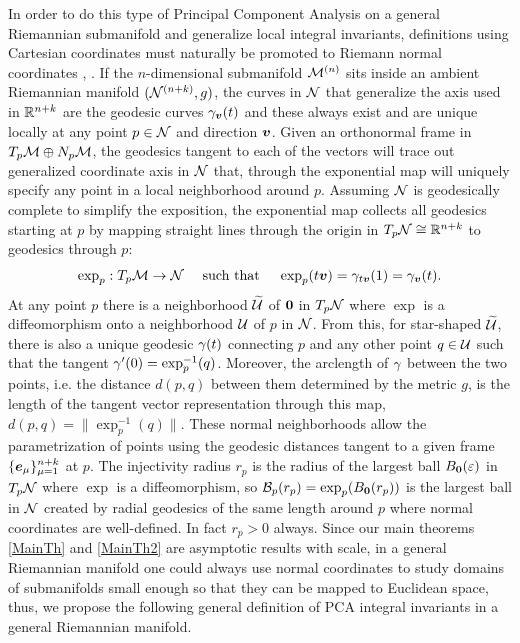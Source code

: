 \documentclass[letterpaper, reqno, 11pt]{amsart}
\theoremstyle{definition}
\theoremstyle{remark}
\numberwithin{equation}{section}
\begin{document}
In order to do this type of Principal Component Analysis on a general Riemannian submanifold and generalize local integral invariants, definitions using Cartesian coordinates must naturally be promoted to Riemann normal coordinates \cite{chavel2006}, \cite{oneil1983}.
If the $n$-dimensional submanifold ${\mathcal M}^{(n)}$ sits inside an ambient Riemannian manifold $(\mathcal{N}^{(n+k)},g)$, the curves in $\mathcal{N}$ that generalize the axis used in ${\mathbb R}^{n+k}$ are the geodesic curves $\gamma_{\boldsymbol{v}}(t)$ and these always exist and are unique locally at any point $p\in\mathcal{N}$ and direction $\boldsymbol{v}$. Given an orthonormal frame in $T_p{\mathcal M}\oplus N_p{\mathcal M}$, the geodesics tangent to each of the vectors will trace out generalized coordinate axis in $\mathcal{N}$ that, through the exponential map will uniquely specify any point in a local neighborhood around $p$. Assuming $\mathcal{N}$ is geodesically complete to simplify the exposition, the exponential map collects all geodesics starting at $p$ by mapping straight lines through the origin in $T_p\mathcal{N}\cong{\mathbb R}^{n+k}$ to geodesics through $p$:
$$
\exp_p: T_p\mathcal{M}\rightarrow\mathcal{N}\quad \text{ such that }\quad \exp_p(t\boldsymbol{v}) = \gamma_{t\boldsymbol{v}}(1)=\gamma_{\boldsymbol{v}}(t).
$$
At any point $p$ there is a neighborhood $\widetilde{\mathcal{U}}$ of $\boldsymbol{0}$ in $T_p\mathcal{N}$ where $\exp$ is a diffeomorphism onto a neighborhood $\mathcal{U}$ of $p$ in $\mathcal{N}$. From this, for star-shaped $\widetilde{\mathcal{U}}$, there is also a unique geodesic $\gamma(t)$ connecting $p$ and any other point $q\in\mathcal{U}$ such that the tangent $\gamma'(0)=\exp^{-1}_p(q)$. Moreover, the arclength of $\gamma$ between the two points, i.e. the distance $d(p,q)$ between them determined by the metric $g$, is the length of the tangent vector representation through this map, $d(p,q)  = \| \exp^{-1}_p(q) \|$.
These normal neighborhoods allow the parametrization of points using the geodesic distances tangent to a given frame $\{\boldsymbol{e}_\mu\}_{\mu=1}^{n+k}$ at $p$. The injectivity radius $r_p$ is the radius of the largest ball $B_{\boldsymbol{0}}(\varepsilon)$ in $T_p\mathcal{N}$ where $\exp$ is a diffeomorphism, so ${\mathcal B}_p(r_p)=\exp_p(B_{\boldsymbol{0}}(r_p))$ is the largest ball in $\mathcal{N}$ created by radial geodesics of the same length around $p$ where normal coordinates are well-defined. In fact $r_p>0$ always. Since our main theorems \ref{MainTh} and \ref{MainTh2} are asymptotic results with scale, in a general Riemannian manifold one could always use normal coordinates to study domains of submanifolds small enough so that they can be mapped to Euclidean space, thus, we propose the following general definition of PCA integral invariants in a general Riemannian manifold.
\end{document}
